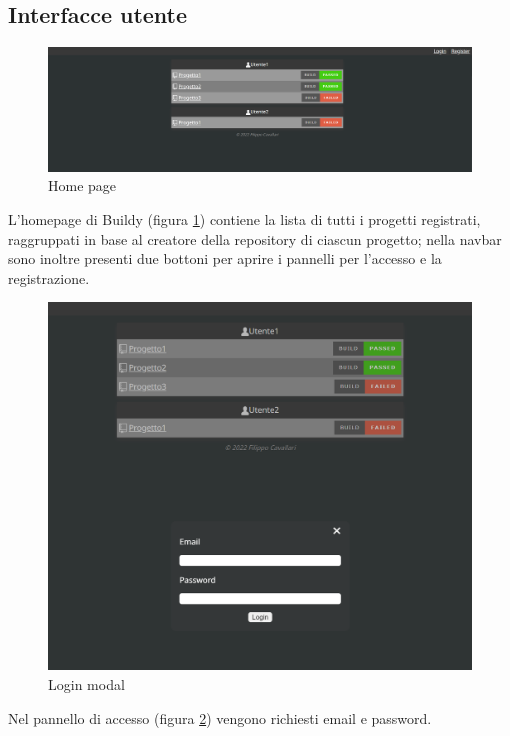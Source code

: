 \documentclass{report}
\begin{document}
\subsection{Interfacce utente}
\begin{figure}[h!]
\centering
\includegraphics[scale=0.44]{homepage.png}
\caption{Home page}
\label{fig:homepage}
\end{figure}
L'homepage di Buildy (figura \ref{fig:homepage}) contiene la lista di tutti i progetti registrati, raggruppati in base al creatore della repository di ciascun progetto; nella navbar sono inoltre presenti due bottoni per aprire i pannelli per l'accesso e la registrazione.\\
\begin{figure}[h!]
\centering
\includegraphics[scale=0.44]{login.png}
\caption{Login modal}
\label{fig:loginmodal}
\end{figure}
Nel pannello di accesso (figura \ref{fig:loginmodal}) vengono richiesti email e password.\\
\end{document}
